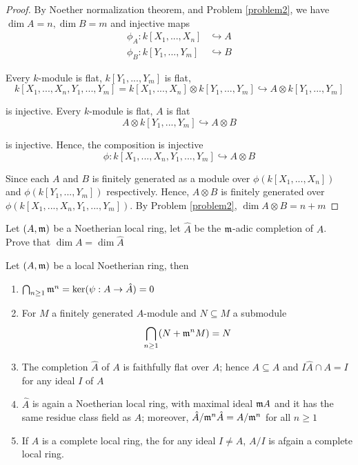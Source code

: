 \begin{proof}
	By Noether normalization theorem, and Problem \ref{problem2},  we have $\dim A = n, \dim B = m$ and injective maps
	\begin{align*}
		\phi_A : k[X_1, ..., X_n] &\hookrightarrow A \\
		\phi_B : k[Y_1, ..., Y_m] &\hookrightarrow B
	\end{align*}
	
	Every $k$-module is flat, $k[Y_1, ..., Y_m]$ is flat,
	$$
		 k[X_1, ..., X_n, Y_1, ..., Y_m] = k[X_1, ..., X_n] \otimes k[Y_1, ..., Y_m] \hookrightarrow A \otimes k[Y_1, ..., Y_m]
	$$
	
	is injective. Every $k$-module is flat, $A$ is flat
	$$
		A \otimes k[Y_1, ..., Y_m] \hookrightarrow A \otimes B
	$$
	
	is injective. Hence, the composition is injective
	$$
		\phi: k[X_1, ..., X_n, Y_1, ..., Y_m] \hookrightarrow A \otimes B
	$$
	
	Since each $A$ and $B$ is finitely generated as a module over $\phi(k[X_1, ..., X_n])$ and $\phi(k[Y_1, ..., Y_m])$ respectively. Hence, $A \otimes B$ is finitely generated over $\phi(k[X_1, ..., X_n, Y_1, ..., Y_m])$. By Problem \ref{problem2}, $\dim A \otimes B = n + m$
\end{proof}

\begin{problem}
	Let $(A, \mathfrak{m})$ be a Noetherian local ring, let $\hat{A}$ be the $\mathfrak{m}$-adic completion of $A$. Prove that $\dim A = \dim \hat{A}$
\end{problem}

\begin{lemma}
	\label{lemma15}
	Let $(A, \mathfrak{m})$ be a local Noetherian ring, then
	\begin{enumerate}
		\item $\bigcap_{n \geq 1} \mathfrak{m}^n = \ker (\psi: A \to \hat{A}) = 0$
		
		\item For $M$ a finitely generated $A$-module and $N \subseteq M$ a submodule
		$$
			\bigcap_{n \geq 1} (N + \mathfrak{m}^n M) = N
		$$
		
		\item The completion $\hat{A}$ of $A$ is faithfully flat over $A$; hence $A \subseteq \hat{A}$ and $I \hat{A} \cap A = I$ for any ideal $I$ of $A$
		
		\item $\hat{A}$ is again a Noetherian local ring, with maximal ideal $\mathfrak{m} A$ and it has the same residue class field as $A$; moreover, $\hat{A} / \mathfrak{m}^n \hat{A} = A / \mathfrak{m}^n$ for all $n \geq 1$
		
		\item If $A$ is a complete local ring, the for any ideal $I \neq A$, $A / I$ is afgain a complete local ring.
	\end{enumerate}
	
\end{lemma}

